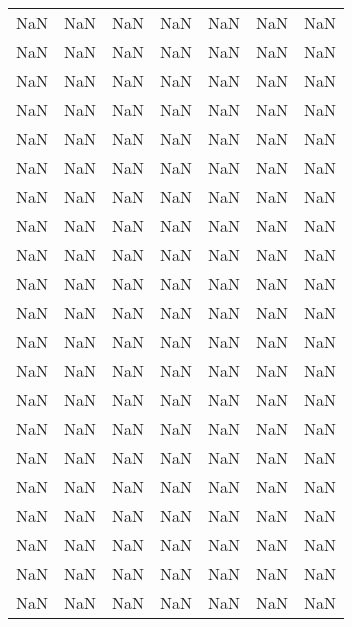 \begin{tabular}{rrrrrrr}
     NaN &         NaN &         NaN &     NaN &   NaN &          NaN &      NaN \\
     NaN &         NaN &         NaN &     NaN &   NaN &          NaN &      NaN \\
     NaN &         NaN &         NaN &     NaN &   NaN &          NaN &      NaN \\
     NaN &         NaN &         NaN &     NaN &   NaN &          NaN &      NaN \\
     NaN &         NaN &         NaN &     NaN &   NaN &          NaN &      NaN \\
     NaN &         NaN &         NaN &     NaN &   NaN &          NaN &      NaN \\
     NaN &         NaN &         NaN &     NaN &   NaN &          NaN &      NaN \\
     NaN &         NaN &         NaN &     NaN &   NaN &          NaN &      NaN \\
     NaN &         NaN &         NaN &     NaN &   NaN &          NaN &      NaN \\
     NaN &         NaN &         NaN &     NaN &   NaN &          NaN &      NaN \\
     NaN &         NaN &         NaN &     NaN &   NaN &          NaN &      NaN \\
     NaN &         NaN &         NaN &     NaN &   NaN &          NaN &      NaN \\
     NaN &         NaN &         NaN &     NaN &   NaN &          NaN &      NaN \\
     NaN &         NaN &         NaN &     NaN &   NaN &          NaN &      NaN \\
     NaN &         NaN &         NaN &     NaN &   NaN &          NaN &      NaN \\
     NaN &         NaN &         NaN &     NaN &   NaN &          NaN &      NaN \\
     NaN &         NaN &         NaN &     NaN &   NaN &          NaN &      NaN \\
     NaN &         NaN &         NaN &     NaN &   NaN &          NaN &      NaN \\
     NaN &         NaN &         NaN &     NaN &   NaN &          NaN &      NaN \\
     NaN &         NaN &         NaN &     NaN &   NaN &          NaN &      NaN \\
     NaN &         NaN &         NaN &     NaN &   NaN &          NaN &      NaN \\

\end{tabular}
